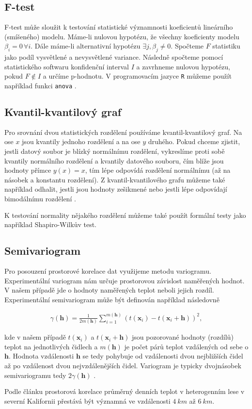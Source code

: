 \subsection{F-test}
F-test může sloužit k testování statistické významnosti koeficientů lineárního (smíšeného) modelu. Máme-li nulovou hypotézu, že všechny koeficienty modelu $\beta_i = 0\, \forall i$. Dále máme-li alternativní hypotézu $\exists j, \beta_j\neq 0$. Spočteme $F$ statistiku jako podíl vysvětlené a nevysvětlené variance. Následně spočteme pomocí statistického softwaru konfidenční interval $I$ a zavrhneme nulovou hypotézu, pokud $F\notin I$ a určíme p-hodnotu. V programovacím jazyce \texttt{R} můžeme použít například funkci \texttt{anova} \parencite{ftest}.

\subsection{Kvantil-kvantilový graf}
Pro srovnání dvou statistických rozdělení používáme kvantil-kvantilový graf. Na ose $x$ jsou kvantily jednoho rozdělení a na ose $y$ druhého. Pokud chceme zjistit, jestli datový soubor je blízký normálnímu rozdělení, vykreslíme proti sobě kvantily normálního rozdělení a kvantily datového souboru, čím blíže jsou hodnoty přímce $y(x)=x$, tím lépe odpovídá rozdělení normálnímu (až na násobek a konstantu rozdělení). Z kvantil-kvantilového grafu můžeme také například odhalit, jestli jsou hodnoty zešikmené nebo jestli lépe odpovídají bimodálnímu rozdělení \parencite{interpretqqplot}.

K testování normality nějakého rozdělení můžeme také použít formální testy jako například Shapiro-Wilkův test.%

\subsection{Semivariogram}\label{chap:variogram}
Pro posouzení prostorové korelace dat využijeme metodu variogramu. Experimentální variogram nám určuje prostorovou závislost naměřených hodnot. V našem případě jde o hodnoty naměřených teplot neboli jejich rozdíl. Experimentální semivariogram může být definován například následovně

\begin{gather*}
	\gamma(\mathbf{h}) = \frac{1}{2m(\mathbf{h})}\sum_{i=1}^{m(\mathbf{h})}\left(t(\mathbf{x}_i) - t(\mathbf{x}_i+\mathbf{h})\right)^2,
\end{gather*}

kde v našem případě $t(\mathbf{x}_i)$ a $t(\mathbf{x}_i+\mathbf{h})$ jsou pozorované hodnoty (rozdílů) teplot na jednotlivých čidlech a $m(\mathbf{h})$ je počet párů teplot vzdálených od sebe o $\mathbf{h}$. Hodnota vzdálenosti $\mathbf{h}$ se tedy pohybuje od vzdálenosti dvou nejbližších čidel až po vzdálenost dvou nejvzdálenějších čidel. Variogram je typicky dvojnásobek semivariogramu tedy $2\gamma(\mathbf{h})$ \parencite{variogram}.

Podle článku \parencite{predictingforestmicroclimate} prostorová korelace průměrný denních teplot v heterogenním lese v severní Kalifornii přestává být významná ve vzdálenosti $\SI{4}{km}$ až $\SI{6}{km}$.
